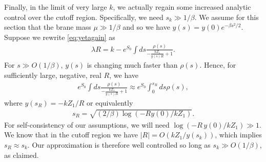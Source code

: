 \documentclass[11pt]{article}
\newcommand{\smax}{s_k}
\numberwithin{equation}{section}
\begin{document}
Finally, in the limit of very large $k$, we actually regain some increased analytic control over the cutoff region. Specifically, we need $\smax \gg 1/\beta$. We assume for this section that the brane mass $\mu \gg 1/\beta$ and so we have $y(s) = y(0)e^{-\beta s^2/2}$. Suppose we rewrite \eqref{eq:yetagain} as
\begin{align} \label{eq:yetyetagain}
\lambda R = k - e^{S_0} \int ds \frac{\rho(s)}{- \frac{k Z_1}{y(s) R} + 1}.
\end{align}
For $s \gg O(1/\beta)$, $y(s)$ is changing much faster than $\rho(s)$. Hence, for sufficiently large, negative, real $R$, we have
\begin{align}
e^{S_0} \int ds \frac{\rho(s)}{- \frac{k Z_1}{y(s) R} + 1} \approx e^{S_0} \int_0^{s_R} ds \rho(s),
\end{align}
where $y(s_R) = - k Z_1 / R$ or equivalently 
\begin{align}\label{eq:sR}
s_R = \sqrt{(2/\beta)  \log (- Ry(0)/k Z_1)}.
\end{align} 
For self-consistency of our assumptions, we will need $\log (- R \,y(0)/k Z_1) \gg 1$. We know that in the cutoff region we have $|R| = O(kZ_1/y(\smax))$, which implies $s_R \approx \smax$. Our approximation is therefore well controlled so long as $\smax \gg O(1/\beta)$, as claimed. 
\end{document}
